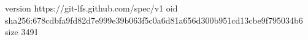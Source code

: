 version https://git-lfs.github.com/spec/v1
oid sha256:678cdbfa9fd82d7e999e39b063f5c0a6d81a656d300b951cd13cbe9f795034b6
size 3491
